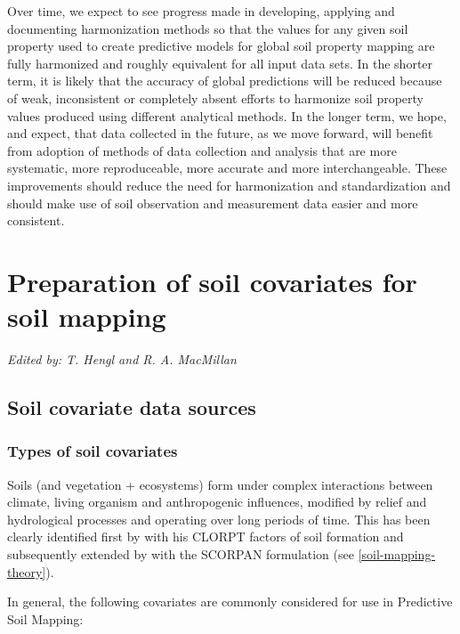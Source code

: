 \documentclass[graybox,natbib,nospthms,UStrade]{svmono}
\renewcommand{\hyperlink}[2]{\autoref{#1}}
\begin{document}
Over time, we expect to see progress made in developing, applying and
documenting harmonization methods so that the values for any given soil
property used to create predictive models for global soil property
mapping are fully harmonized and roughly equivalent for all input data
sets. In the shorter term, it is likely that the accuracy of global
predictions will be reduced because of weak, inconsistent or completely
absent efforts to harmonize soil property values produced using
different analytical methods. In the longer term, we hope, and expect,
that data collected in the future, as we move forward, will benefit from
adoption of methods of data collection and analysis that are more
systematic, more reproduceable, more accurate and more interchangeable.
These improvements should reduce the need for harmonization and
standardization and should make use of soil observation and measurement
data easier and more consistent.

\hypertarget{soil-covs-chapter}{%
\chapter{Preparation of soil covariates for soil mapping}\label{soil-covs-chapter}}

\emph{Edited by: T. Hengl and R. A. MacMillan}

\hypertarget{soil-covariate-data-sources}{%
\section{Soil covariate data sources}\label{soil-covariate-data-sources}}

\hypertarget{types-of-soil-covariates}{%
\subsection{Types of soil covariates}\label{types-of-soil-covariates}}

Soils (and vegetation + ecosystems) form under complex interactions between climate, living organism and anthropogenic influences, modified by relief and hydrological processes and operating over long periods of time.
This has been clearly identified first by \citet{jenny1994factors} with his CLORPT factors of soil formation and subsequently extended by \citet{MCBRATNEY20033} with the SCORPAN formulation (see \protect\hyperlink{soil-mapping-theory}{Introduction chapter}).

In general, the following covariates are commonly considered for use in Predictive Soil Mapping:
\end{document}
